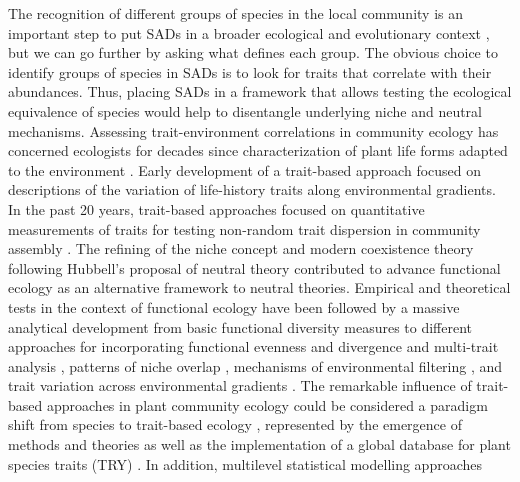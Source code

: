 \documentclass[12pt]{article}
\begin{document}
The recognition of different groups of species in the local community is an important step to put SADs in a broader ecological and evolutionary context \citep{McGill2007, Swenson2012}, but we can go further by asking what defines each group. The obvious choice to identify groups of species in SADs is to look for traits that correlate with their abundances.  Thus, placing SADs in a framework that allows testing the ecological equivalence of species would help to disentangle underlying niche and neutral mechanisms. Assessing trait-environment correlations in community ecology has concerned ecologists for decades since \cite{Raunkiaer1934} characterization of plant life forms adapted to the environment \citep[see also][]{Grime1977, Connell1978}. Early development of a trait-based approach focused on descriptions of the variation of life-history traits along environmental gradients. In the past 20 years, trait-based approaches focused on quantitative measurements of traits for testing non-random trait dispersion in community assembly
\citep{Swenson2012}.
The refining of the niche concept \citep{Chase2003} and
modern coexistence theory \citep{Chesson2000} following  Hubbell's proposal of neutral theory \citep{Hubbell2001} contributed to
advance functional ecology as an alternative framework to neutral theories. 
Empirical and theoretical tests in the context of functional ecology have been followed by a massive analytical development \citep{Kraft2010} from basic functional diversity measures
\citep{Petchey2002a, Petchey2007} to different approaches for incorporating functional evenness and divergence \citep{Mason2005, Pavoine2009} and multi-trait analysis \citep{Laliberte2010}, patterns of niche overlap \citep{Mason2008}, mechanisms of environmental filtering \citep{Kraft2007, Mayfield2009}, and trait
variation across environmental gradients \citep{shipley2006plant, cornwell2009community, messier2010traits}. 
The remarkable influence of trait-based approaches in plant community ecology could be considered a paradigm shift from species to trait-based ecology \citep{Pavoine2011, Swenson2012}, represented by the emergence of methods and theories as well as the implementation of a global database for plant species traits (TRY) \citep{Kattage2011}.
In addition,
multilevel statistical modelling approaches %
\end{document}
